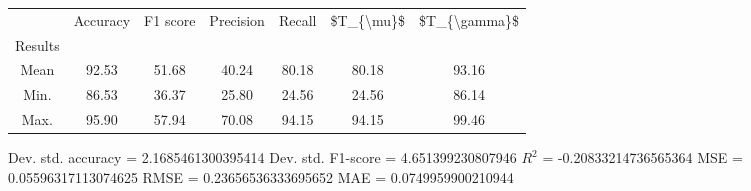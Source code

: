 \begin{tabular}{|c|c|c|c|c|c|c|}
\toprule
{} &  Accuracy &  F1 score &  Precision &  Recall &  \$T\_\{\textbackslash mu\}\$ &  \$T\_\{\textbackslash gamma\}\$ \\
Results &           &           &            &         &            &               \\
\hline
Mean    &     92.53 &     51.68 &      40.24 &   80.18 &      80.18 &         93.16 \\
Min.    &     86.53 &     36.37 &      25.80 &   24.56 &      24.56 &         86.14 \\
Max.    &     95.90 &     57.94 &      70.08 &   94.15 &      94.15 &         99.46 \\
\bottomrule
\end{tabular}

 Dev. std. accuracy = 2.1685461300395414
 Dev. std. F1-score = 4.651399230807946
 $R^2$ = -0.20833214736565364
 MSE = 0.05596317113074625
 RMSE = 0.23656536333695652
 MAE = 0.0749959900210944